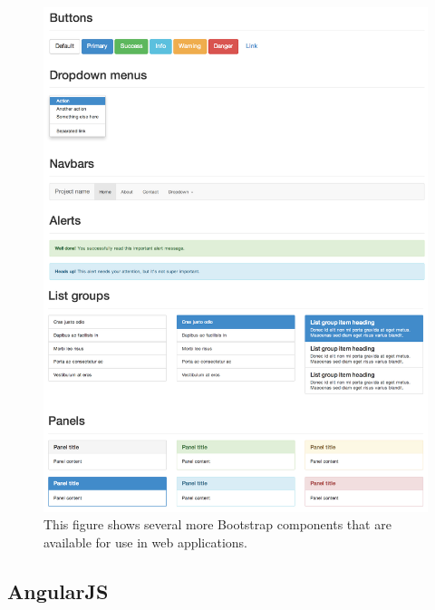 \begin{figure}
\begin{center}
\includegraphics[height=\textheight,width=5in,keepaspectratio]{figures/bootstrap_components.jpg}
\caption[Bootstrap Components \cite{bootstrap2014}]{This figure shows several more Bootstrap components that are available for use in web applications\cite{bootstrap2014}.\label{fig:bootstrap_components}}
\end{center}
\end{figure}

\subsection{AngularJS}

